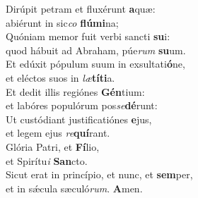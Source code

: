 \evenverse Dirúpit petram et fluxérunt \textbf{a}quæ:~\*\\
\evenverse abiérunt in sic\textit{co} \textbf{flú}\textbf{mi}na;\\
\oddverse Quóniam memor fuit verbi sancti \textbf{su}i:~\*\\
\oddverse quod hábuit ad Abraham, púe\textit{rum} \textbf{su}um.\\
\evenverse Et edúxit pópulum suum in exsultati\textbf{ó}ne,~\*\\
\evenverse et eléctos suos in \textit{læ}\textbf{tí}\textbf{ti}a.\\
\oddverse Et dedit illis regiónes \textbf{Gén}tium:~\*\\
\oddverse et labóres populórum pos\textit{se}\textbf{dé}runt:\\
\evenverse Ut custódiant justificatiónes \textbf{e}jus,~\*\\
\evenverse et legem ejus \textit{re}\textbf{quí}rant.\\
\oddverse Glória Patri, et \textbf{Fí}lio,~\*\\
\oddverse et Spirítu\textit{i} \textbf{San}cto.\\
\evenverse Sicut erat in princípio, et nunc, et \textbf{sem}per,~\*\\
\evenverse et in sǽcula sæculó\textit{rum}. \textbf{A}men.\\
